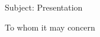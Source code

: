 \documentclass[11pt]{letter} %
\begin{document}

\begin{letter}{} 
\date{}%


\signature{Santiago Bragagnolo} %


Subject: Presentation

\opening{To whom it may concern} 
 
 

\end{letter}
\end{document}
